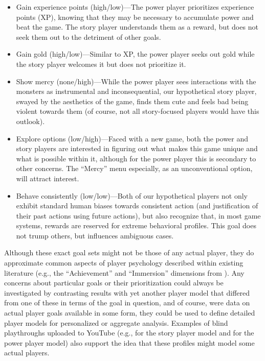 \documentclass[arts,article,accept,moreauthors,pdftex,10pt,a4paper]{Definitions/mdpi}
\begin{document}
\begin{itemize}
  \item Gain experience points (high/low)---The power player prioritizes experience points (XP), knowing that they may be necessary to accumulate power and beat the game. The story player understands them as a reward, but does not seek them out to the detriment of other goals.
  \item Gain gold (high/low)---Similar to XP, the power player seeks out gold while the story player welcomes it but does not prioritize it.
  \item Show mercy (none/high)---While the power player sees interactions with the monsters as instrumental and inconsequential, our hypothetical story player, swayed by the aesthetics of the game, finds them cute and feels bad being violent towards them (of course, not all story-focused players would have this outlook).
  \item Explore options (low/high)---Faced with a new game, both the power and story players are interested in figuring out what makes this game unique and what is possible within it, although for the power player this is secondary to other concerns. The ``Mercy'' menu especially, as an unconventional option, will attract interest.
  \item Behave consistently (low/low)---Both of our hypothetical players not only exhibit standard human biases towards consistent action (and justification of their past actions using future actions), but also recognize that, in most game systems, rewards are reserved for extreme behavioral profiles. This goal does not trump others, but influences ambiguous cases.
\end{itemize}
Although these exact goal sets might not be those of any actual player, they do approximate common aspects of player psychology described within existing literature (e.g., the ``Achievement'' and ``Immersion'' dimensions from \cite{hamari2014player}).
%
Any concerns about particular goals or their prioritization could always be investigated by contrasting results with yet another player model that differed from one of these in terms of the goal in question, and of course, were data on actual player goals available in some form, they could be used to define detailed player models for personalized or aggregate analysis.
%
Examples of blind playthroughs uploaded to YouTube (e.g., \cite{fuandon2015lets} for the story player model and \cite{therpgminx2015lets} for the power player model) also support the idea that these profiles might model some actual players.
\end{document}
